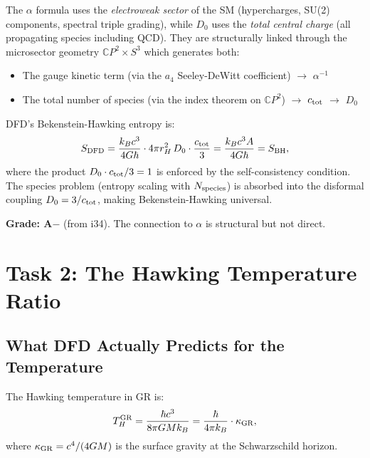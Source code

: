 \documentclass[11pt,a4paper]{article}
\begin{document}
The $\alpha$ formula uses the \emph{electroweak sector} of the SM (hypercharges, SU(2) components, spectral triple grading), while $D_0$ uses the \emph{total central charge} (all propagating species including QCD). They are structurally linked through the microsector geometry $\mathbb{C}P^2 \times S^3$ which generates both:
\begin{itemize}
\item The gauge kinetic term (via the $a_4$ Seeley-DeWitt coefficient) $\to$ $\alpha^{-1}$
\item The total number of species (via the index theorem on $\mathbb{C}P^2$) $\to$ $c_{\rm tot}$ $\to$ $D_0$
\end{itemize}

\begin{tcolorbox}[colback=blue!5!white, colframe=blue!50!black, title=Key Result: BH Entropy]
DFD's Bekenstein-Hawking entropy is:
\begin{equation}
S_{\rm DFD} = \frac{k_B c^3}{4G\hbar}\cdot 4\pi r_H^2\,D_0\cdot\frac{c_{\rm tot}}{3} = \frac{k_B c^3 A}{4G\hbar} = S_{\rm BH},
\end{equation}
where the product $D_0 \cdot c_{\rm tot}/3 = 1$ is enforced by the self-consistency condition. The species problem (entropy scaling with $N_{\rm species}$) is absorbed into the disformal coupling $D_0 = 3/c_{\rm tot}$, making Bekenstein-Hawking universal.

\textbf{Grade: A$-$} (from i34). The connection to $\alpha$ is structural but not direct.
\end{tcolorbox}


\section{Task 2: The Hawking Temperature Ratio}
\label{sec:hawking-temp}

\subsection{What DFD Actually Predicts for the Temperature}

The Hawking temperature in GR is:
\begin{equation}
T_H^{\rm GR} = \frac{\hbar c^3}{8\pi G M k_B} = \frac{\hbar}{4\pi k_B}\cdot\kappa_{\rm GR},
\end{equation}
where $\kappa_{\rm GR} = c^4/(4GM)$ is the surface gravity at the Schwarzschild horizon.
\end{document}
